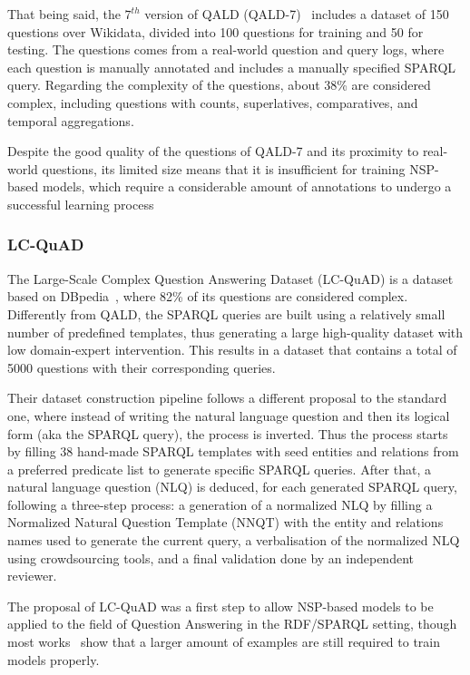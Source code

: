 That being said, the $7^{th}$ version of QALD (QALD-7)~\cite{dataset:qald7-UsbeckNHKRN17} includes a 
dataset of 150 questions over Wikidata, divided into 100 questions for training and 50 for 
testing. The questions comes from a real-world question and query logs, where each question is 
manually annotated and includes a manually specified SPARQL query. Regarding the complexity of 
the questions, about 38\% are considered complex, including questions with counts, superlatives, 
comparatives, and temporal aggregations.

Despite the good quality of the questions of QALD-7 and its proximity to real-world questions, 
its limited size means that it is insufficient for training NSP-based models, which require a 
considerable amount of annotations to undergo a successful learning process

\subsubsection{LC-QuAD}
\label{cap2:qakg/benchmarkDatasets/lcquad}
The Large-Scale Complex Question Answering Dataset (LC-QuAD) is a dataset based on 
DBpedia~\cite{dataset:lcquad-TrivediMDL17}, where 82\% of its questions are considered complex. 
Differently from QALD, the SPARQL queries are built using a relatively small number of 
predefined templates, thus generating a large high-quality dataset with low domain-expert 
intervention. This results in a dataset that contains a total of 5000 questions with their 
corresponding queries.

Their dataset construction pipeline follows a different proposal to the standard one, where 
instead of writing the natural language question and then its logical form (aka the SPARQL 
query), the process is inverted. Thus the process starts by filling 38 hand-made SPARQL 
templates with seed entities and relations from a preferred predicate list to generate specific 
SPARQL queries. After that, a natural language question (NLQ) is deduced, for each generated 
SPARQL query, following a three-step process: a generation of a normalized NLQ by filling a 
Normalized Natural Question Template (NNQT) with the entity and relations names used to 
generate the current query, a verbalisation of the normalized NLQ using crowdsourcing tools, 
and a final validation done by an independent reviewer.

The proposal of LC-QuAD was a first step to allow NSP-based models to be applied to the field 
of Question Answering in the RDF/SPARQL setting, though most works~\cite{qa:FuQTLYS20abs-2007-13069} 
show that a larger amount of examples are still required to train models properly.


